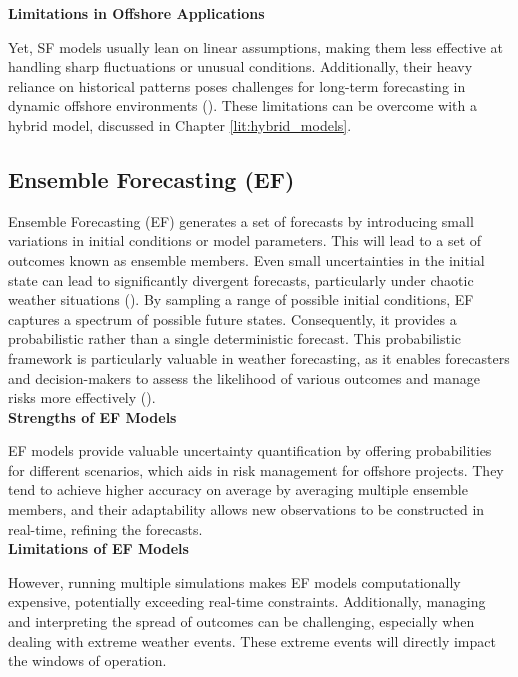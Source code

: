 \noindent\textbf{Limitations in Offshore Applications}

\noindent Yet, SF models usually lean on linear assumptions, making them less effective at handling sharp fluctuations or unusual conditions. Additionally, their heavy reliance on historical patterns poses challenges for long-term forecasting in dynamic offshore environments (\cite{Zhang2019}). These limitations can be overcome with a hybrid model, discussed in Chapter \ref{lit:hybrid_models}.

\newpage
\subsection{Ensemble Forecasting (EF)}
\label{ensemble_forecasting}
Ensemble Forecasting (EF) generates a set of forecasts by introducing small variations in initial conditions or model parameters. This will lead to a set of outcomes known as ensemble members. Even small uncertainties in the initial state can lead to significantly divergent forecasts, particularly under chaotic weather situations (\cite{leutbecher2008ensemble}). By sampling a range of possible initial conditions, EF captures a spectrum of possible future states. Consequently, it provides a probabilistic rather than a single deterministic forecast. This probabilistic framework is particularly valuable in weather forecasting, as it enables forecasters and decision-makers to assess the likelihood of various outcomes and manage risks more effectively (\cite{gneiting2005weather}).\\

\noindent\textbf{Strengths of EF Models}

\noindent EF models provide valuable uncertainty quantification by offering probabilities for different scenarios, which aids in risk management for offshore projects. They tend to achieve higher accuracy on average by averaging multiple ensemble members, and their adaptability allows new observations to be constructed in real-time, refining the forecasts.\\

\noindent\textbf{Limitations of EF Models}

\noindent However, running multiple simulations makes EF models computationally expensive, potentially exceeding real-time constraints. Additionally, managing and interpreting the spread of outcomes can be challenging, especially when dealing with extreme weather events. These extreme events will directly impact the windows of operation. 

